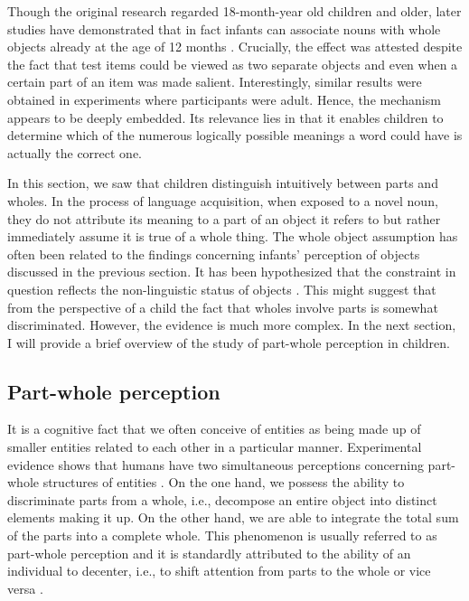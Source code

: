 Though the original research regarded 18-month-year old children and older, later studies have demonstrated that in fact infants can associate nouns with whole objects already at the age of 12 months \citep{hollich_golinkoff_hirsh-pasek2007young}. Crucially, the effect was attested despite the fact that test items could be viewed as two separate objects and even when a certain part of an item was made salient. Interestingly, similar results were obtained in experiments where participants were adult. Hence, the mechanism appears to be deeply embedded. Its relevance lies in that it enables children to determine which of the numerous logically possible meanings a word could have is actually the correct one.

In this section, we saw that children distinguish intuitively between parts and wholes. In the process of language acquisition, when exposed to a novel noun, they do not attribute its meaning to a part of an object it refers to but rather immediately assume it is true of a whole thing. The whole object assumption has often been related to the findings concerning infants' perception of objects discussed in the previous section. It has been hypothesized that the constraint in question reflects the non-linguistic status of objects \citep{hollich_golinkoff_hirsh-pasek2007young}. This might suggest that from the perspective of a child the fact that wholes involve parts is somewhat discriminated. However, the evidence is much more complex. In the next section, I will provide a brief overview of the study of part-whole perception in children.

\subsection{Part-whole perception}\label{sec:part-whole-perception}

It is a cognitive fact that we often conceive of entities as being made up of smaller entities related to each other in a particular manner. Experimental evidence shows that humans have two simultaneous perceptions concerning part-whole structures of entities \citep[e.g.,][]{witkin1950individual,meili-dworetzki1956development}. On the one hand, we possess the ability to discriminate parts from a whole, i.e., decompose an entire object into distinct elements making it up. On the other hand, we are able to integrate the total sum of the parts into a complete whole. This phenomenon is usually referred to as part-whole perception and it is standardly attributed to the ability of an individual to decenter, i.e., to shift attention from parts to the whole or vice versa \citep[see][]{piaget_morf1958isomorphismes}.

